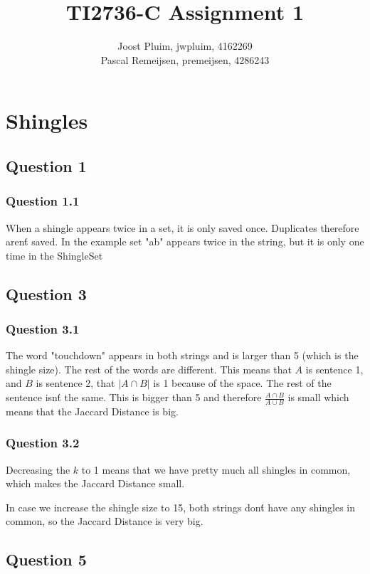 \documentclass[11pt,twoside,a4paper]{article}
\title{TI2736-C Assignment 1}
\author{
	Joost Pluim, jwpluim, 4162269 \\
	Pascal Remeijsen, premeijsen, 4286243
}
\begin{document}
\maketitle
\clearpage

\chapter{Shingles}

\section{Question 1}
	
	\subsection{Question 1.1}
	
		When a shingle appears twice in a set, it is only saved once. Duplicates therefore aren\'t saved. In the example set "ab" appears twice in the string, but it is only one time in the ShingleSet
		
\section{Question 3}

	\subsection{Question 3.1}
	
		The word "touchdown" appears in both strings and is larger than 5 (which is the shingle size). The rest of the words are different. This means that $A$ is sentence 1, and $B$ is sentence 2, that $|A \cap B|$ is 1 because of the space. The rest of the sentence isn\'t the same. This is bigger than 5 and therefore $\frac{A \cap B}{A \cup B}$ is small which means that the Jaccard Distance is big. 
		
	\subsection{Question 3.2}
		Decreasing the $k$ to 1 means that we have pretty much all shingles in common, which makes the Jaccard Distance small. 
		
		In case we increase the shingle size to 15, both strings don\'t have any shingles in common, so the Jaccard Distance is very big.
		
\section{Question 5}
\end{document}
